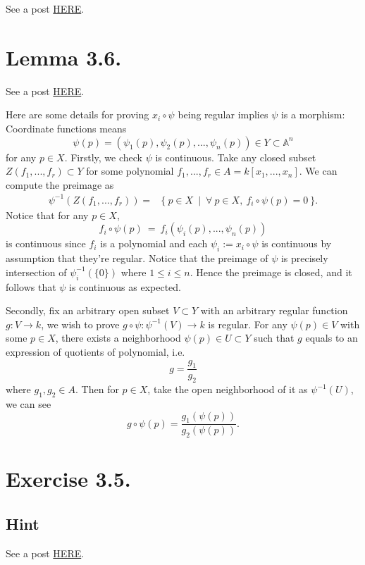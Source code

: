 See a post \href{https://math.stackexchange.com/questions/787770/hartshorne-propositon-i-3-3}{HERE}.

\section{Lemma 3.6.}

See a post \href{https://math.stackexchange.com/questions/457328/hartshorne-lemma-i-3-6}{HERE}.

Here are some details for proving $x_i\circ \psi$ being regular implies $\psi$ is a morphism:
Coordinate functions means 
\[\psi(p)=(\psi_1(p),\psi_2(p),...,\psi_n(p))\in Y\subset \mathbb A^n\] for any $p\in X$.
Firstly, we check $\psi$ is continuous. Take any closed subset $Z(f_1,...,f_r)\subset Y$ for some polynomial $f_1,...,f_r\in A=k[x_1,...,x_n]$. We can compute the preimage as \begin{align*}
    \psi^{-1}(Z(f_1,...,f_r)) =& \{~ p\in X ~\mid ~\forall~ p\in X,~ f_i\circ \psi(p)=0 ~\}.
\end{align*}
Notice that for any $p\in X$, \[f_i\circ \psi(p) ~=~ f_i(\psi_i(p),...,\psi_n(p))\] is continuous since $f_i$ is a polynomial and each $\psi_i:=x_i\circ \psi$ is continuous by assumption that they're regular.
Notice that the preimage of $\psi$ is precisely intersection of $\psi_i^{-1}(\{0\})$ where $1\leq i\leq n$. Hence the preimage is closed, and it follows that $\psi$ is continuous as expected. 

Secondly, fix an arbitrary open subset $V\subset Y$ with an arbitrary regular function $g:V\to k$, we wish to prove $g\circ \psi:\psi^{-1}(V)\to k$ is regular. For any $\psi(p)\in V$ with some $p\in X$, there exists a neighborhood $\psi(p)\in U\subset Y$ such that $g$ equals to an expression of quotients of polynomial, i.e. \[g=\frac{g_1}{g_2}\] where $g_1,g_2\in A$. Then for $p\in X$, take the open neighborhood of it as $\psi^{-1}(U)$, we can see 
\[g\circ \psi (p) = \frac{g_1(\psi(p))}{g_2(\psi(p))}.\]

\section{Exercise 3.5.}

\subsection{Hint}
See a post \href{https://math.stackexchange.com/questions/538136/complements-of-hypersurfaces-in-a-projective-space-is-affine}{HERE}.


